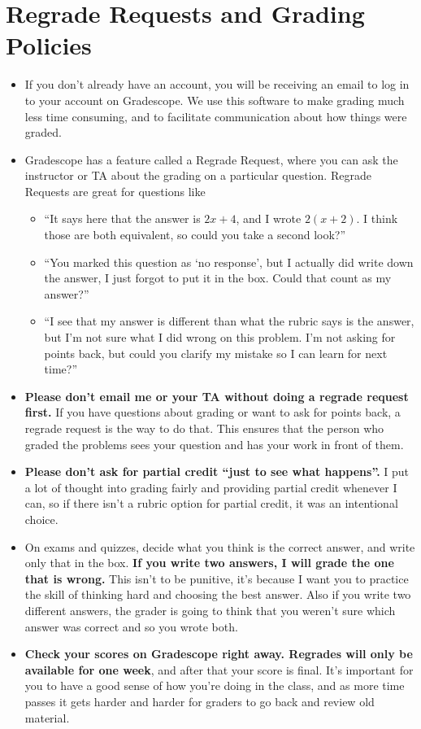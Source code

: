 \documentclass[11pt,letterpaper]{article}
\begin{document}
\section*{Regrade Requests and Grading Policies}
\begin{itemize}[nosep]
\item If you don’t already have an account, you will be receiving an email to log in to your account on Gradescope. We use this software to make grading much less time consuming, and to facilitate communication about how things were graded.
\item Gradescope has a feature called a Regrade Request, where you can ask the instructor or TA about the grading on a particular question. Regrade Requests are great for questions like
  \begin{itemize}[nosep, label={$\circ$}]
  \item “It says here that the answer is $2x+4$, and I wrote $2(x+2)$. I think those are both equivalent, so could you take a second look?”
  \item “You marked this question as ‘no response’, but I actually did write down the answer, I just forgot to put it in the box. Could that count as my answer?”
  \item “I see that my answer is different than what the rubric says is the answer, but I’m not sure what I did wrong on this problem. I’m not asking for points back, but could you clarify my mistake so I can learn for next time?”
  \end{itemize}
\item \textbf{Please don’t email me or your TA without doing a regrade request first.} If you have questions about grading or want to ask for points back, a regrade request is the way to do that. This ensures that the person who graded the problems sees your question and has your work in front of them.
\item \textbf{Please don’t ask for partial credit “just to see what happens”.} I put a lot of thought into grading fairly and providing partial credit whenever I can, so if there isn’t a rubric option for partial credit, it was an intentional choice.
\item On exams and quizzes, decide what you think is the correct answer, and write only that in the box. \textbf{If you write two answers, I will grade the one that is wrong.} This isn’t to be punitive, it’s because I want you to practice the skill of thinking hard and choosing the best answer. Also if you write two different answers, the grader is going to think that you weren’t sure which answer was correct and so you wrote both.
\item \textbf{Check your scores on Gradescope right away. Regrades will only be available for one week}, and after that your score is final. It's important for you to have a good sense of how you're doing in the class, and as more time passes it gets harder and harder for graders to go back and review old material.
\end{itemize}
\end{document}
